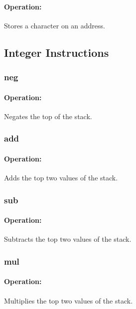 \paragraph{Operation:}
Stores a character on an address.

\subsection{Integer Instructions}


\subsubsection{neg}

\paragraph{Operation:}
Negates the top of the stack.

\subsubsection{add}

\paragraph{Operation:}
Adds the top two values of the stack.

\subsubsection{sub}

\paragraph{Operation:}
Subtracts the top two values of the stack.

\subsubsection{mul}

\paragraph{Operation:}
Multiplies the top two values of the stack.

